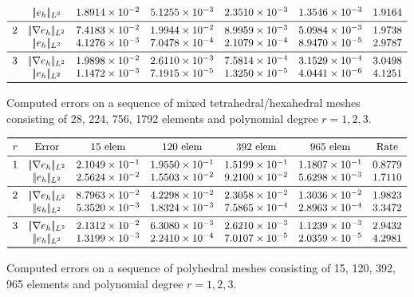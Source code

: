 \documentclass[12pt, a4paper]{article}
\theoremstyle{definition}
\theoremstyle{plain}
\theoremstyle{plain}
\theoremstyle{definition}
\begin{document}
\begin{table}[h!]
\[\begin{array}{ccccccc}
	& |\!|e_{h}|\!|_{L^2} & 1.8914 \times 10^{-2} & 5.1255 \times 10^{-3} & 2.3510 \times 10^{-3} & 1.3546 \times 10^{-3} & 1.9164\\
	\midrule
	2 & |\!|\nabla e_{h}|\!|_{L^2} & 7.4183 \times 10^{-2} & 1.9944 \times 10^{-2} & 8.9959 \times 10^{-3} & 5.0984 \times 10^{-3} & 1.9738\\
	& |\!|e_{h}|\!|_{L^2} & 4.1276 \times 10^{-3} & 7.0478 \times 10^{-4} & 2.1079 \times 10^{-4} & 8.9470 \times 10^{-5} & 2.9787\\
	\midrule
	3 & |\!|\nabla e_{h}|\!|_{L^2} & 1.9898 \times 10^{-2} & 2.6110 \times 10^{-3} & 7.5814 \times 10^{-4} & 3.1529 \times 10^{-4} & 3.0498\\
	& |\!|e_{h}|\!|_{L^2} & 1.1472 \times 10^{-3} & 7.1915 \times 10^{-5} & 1.3250 \times 10^{-5} & 4.0441 \times 10^{-6} & 4.1251\\
	\bottomrule
	\end{array}
	\]
	\caption{Computed errors on a sequence of mixed tetrahedral/hexahedral 
	meshes consisting of 28, 224, 756, 1792 elements and polynomial degree 
	$r=1,2,3$.} \label{tab:hhextet}
	\[
	\begin{array}{ccccccc}
	\toprule
	r & \text{Error} & \text{15 elem} & \text{120 elem} & \text{392 elem} & \text{965 elem} & \text{Rate} \\ 
	\midrule
	1 & |\!|\nabla e_{h}|\!|_{L^2} & 2.1049 \times 10^{-1} & 1.9550 \times 10^{-1} & 1.5199 \times 10^{-1} & 1.1807 \times 10^{-1} & 0.8779\\
	& |\!|e_{h}|\!|_{L^2} & 2.5624 \times 10^{-2} & 1.5503 \times 10^{-2} & 9.2100 \times 10^{-2} & 5.6298 \times 10^{-3} & 1.7110\\
	\midrule
	2 & |\!|\nabla e_{h}|\!|_{L^2} & 8.7963 \times 10^{-2} & 4.2298 \times 10^{-2} & 2.3058 \times 10^{-2} & 1.3036 \times 10^{-2} & 1.9823\\
	& |\!|e_{h}|\!|_{L^2} & 5.3520 \times 10^{-3} & 1.8324 \times 10^{-3} & 7.5865 \times 10^{-4} & 2.8963 \times 10^{-4} & 3.3472\\
	\midrule
	3 & |\!|\nabla e_{h}|\!|_{L^2} & 2.1312 \times 10^{-2} & 6.3080 \times 10^{-3} & 2.6210 \times 10^{-3} & 1.1239 \times 10^{-3} & 2.9432\\
	& |\!|e_{h}|\!|_{L^2} & 1.3199 \times 10^{-3} & 2.2410 \times 10^{-4} & 7.0107 \times 10^{-5} & 2.0359 \times 10^{-5} & 4.2981\\
	\bottomrule
	\end{array}
	\]
	\caption{Computed errors on a sequence of polyhedral meshes consisting of 
	15, 120, 392, 965 elements and polynomial degree $r=1,2,3$.} \label{tab:hpol}
\end{table}
\end{document}

